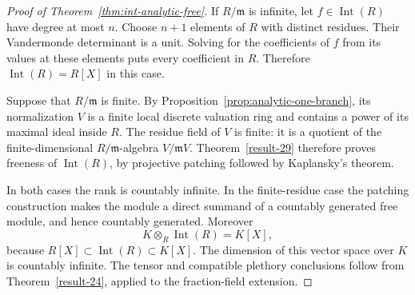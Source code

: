 \begin{proof}[Proof of Theorem~\ref{thm:int-analytic-free}]
If $R/\mathfrak m$ is infinite, let $f\in\operatorname{Int}(R)$ have
degree at most $n$.  Choose $n+1$ elements of $R$ with distinct
residues.  Their Vandermonde determinant is a unit.  Solving for the
coefficients of $f$ from its values at these elements puts every
coefficient in $R$.  Therefore $\operatorname{Int}(R)=R[X]$ in this case.

Suppose that $R/\mathfrak m$ is finite.  By
Proposition~\ref{prop:analytic-one-branch}, its normalization $V$ is
a finite local discrete valuation ring and contains a power of its
maximal ideal inside $R$.  The residue field of $V$ is finite:
it is a quotient of the finite-dimensional $R/\mathfrak m$-algebra
$V/\mathfrak mV$.  Theorem~\ref{result-29} therefore proves freeness
of $\operatorname{Int}(R)$, by projective patching followed by
Kaplansky's theorem.

In both cases the rank is countably infinite.  In the finite-residue
case the patching construction makes the module a direct summand of
a countably generated free module, and hence countably generated.
Moreover
\[
 K\otimes_R\operatorname{Int}(R)=K[X],
\]
because $R[X]\subset\operatorname{Int}(R)\subset K[X]$.
The dimension of this vector space over $K$ is countably infinite.
The tensor and compatible plethory conclusions follow from
Theorem~\ref{result-24}, applied to the fraction-field extension.
\end{proof}
